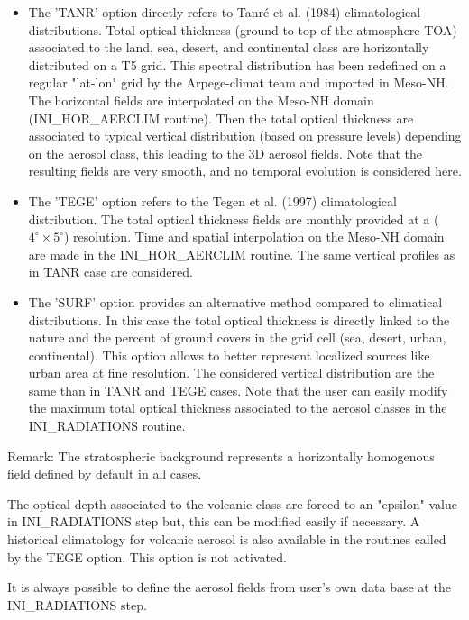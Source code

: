 \begin{itemize}

\item The 'TANR' option directly refers to Tanr\'e et al. (1984)
  climatological distributions. Total optical thickness (ground to top
  of the atmosphere TOA) associated to the land, sea, desert, and continental class are horizontally distributed on a T5 grid. This spectral distribution has been redefined on a regular "lat-lon" grid by the Arpege-climat team and imported in Meso-NH. The horizontal fields are interpolated on the Meso-NH domain (INI\_HOR\_AERCLIM routine). Then the total optical thickness are associated to typical vertical distribution (based on pressure levels) depending on the aerosol class, this leading to the 3D aerosol fields. Note that the resulting fields are very smooth, and no temporal evolution is considered here.  

\item The 'TEGE' option refers to the Tegen et al. (1997) climatological distribution. The total optical thickness fields are monthly provided at a ($4^\circ \times 5^\circ$) resolution. Time and spatial interpolation on the Meso-NH domain are made in the INI\_HOR\_AERCLIM routine. The same vertical profiles as in TANR case are considered. 

\item The 'SURF' option provides an alternative method compared to climatical distributions. In this case the total optical thickness is directly linked to the nature and the percent of ground covers in the grid cell (sea, desert, urban, continental). This option allows to better represent localized sources like urban area at fine resolution. The considered vertical distribution are the same than in TANR and TEGE cases. Note that the user can easily modify the maximum total optical thickness associated to the aerosol classes in the INI\_RADIATIONS routine.


\end{itemize}


Remark: The stratospheric background represents a horizontally homogenous field defined by default in all cases.

The optical depth associated to the volcanic class are forced to an "epsilon" value in INI\_RADIATIONS step but, this can be modified easily if necessary. A historical climatology for volcanic aerosol is also available in the routines called by the TEGE option. This option is not activated.

It is always possible to define the aerosol fields from user's own data base at the INI\_RADIATIONS step.

